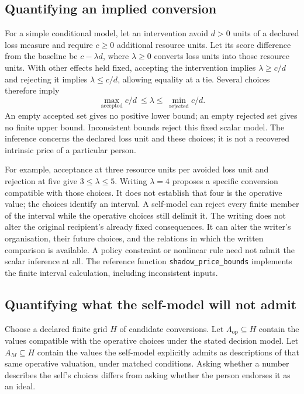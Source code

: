 \documentclass[11pt,a4paper]{article}
\theoremstyle{remark}
\begin{document}
\subsection{Quantifying an implied conversion}

For a simple conditional model, let an intervention avoid $d>0$ units of a
declared loss measure and require $c\geq0$ additional resource units. Let its
score difference from the baseline be $c-\lambda d$, where $\lambda\geq0$ converts
loss units into those resource units. With other effects held fixed, accepting
the intervention implies $\lambda\geq c/d$ and rejecting it implies
$\lambda\leq c/d$, allowing equality at a tie. Several choices therefore imply
\begin{equation}\label{eq:shadow}
\max_{\mathrm{accepted}}c/d\ \leq\lambda\leq\
\min_{\mathrm{rejected}}c/d.
\end{equation}
An empty accepted set gives no positive lower bound; an empty rejected set
gives no finite upper bound. Inconsistent bounds reject this fixed scalar
model. The inference concerns the declared loss unit and these choices; it is
not a recovered intrinsic price of a particular person.

For example, acceptance at three resource units per avoided loss unit and
rejection at five give $3\leq\lambda\leq5$. Writing $\lambda=4$ proposes a specific
conversion compatible with those choices. It does not establish that four is
the operative value; the choices identify an interval. A self-model can reject
every finite member of the interval while the operative choices still delimit it. The writing does not alter the
original recipient's already fixed consequences. It can alter the writer's
organisation, their future choices, and the relations in which the written
comparison is available. A policy constraint or nonlinear rule need not admit
the scalar inference at all. The reference function \texttt{shadow\_price\_bounds}
implements the finite interval calculation, including inconsistent inputs.

\subsection{Quantifying what the self-model will not admit}

Choose a declared finite grid $H$ of candidate conversions. Let
$\Lambda_{\mathrm{op}}\subseteq H$ contain the values compatible with the operative
choices under the stated decision model. Let $A_M\subseteq H$ contain the values
the self-model explicitly admits as descriptions of that same operative
valuation, under matched conditions. Asking whether a number describes the
self's choices differs from asking whether the person endorses it as an ideal.
\end{document}
